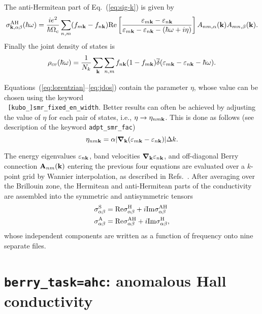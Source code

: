 The anti-Hermitean part of Eq.~(\ref{eq:sig-k}) is given by
%
\begin{equation}
\label{eq:sig-AH}
\sigma_{{\bf k},\alpha\beta}^{\rm AH}(\hbar\omega)=\frac{ie^2}{\hbar\Omega_c}
\sum_{n,m}(f_{m{\bf k}}-f_{n{\bf k}})
{\rm Re}\left[ \frac{\varepsilon_{m{\bf k}}-\varepsilon_{n{\bf k}}}
                    {\varepsilon_{m{\bf k}}-\varepsilon_{n{\bf k}}
                     -(\hbar\omega+i\eta)}
\right]
A_{nm,\alpha}({\bf k})A_{mn,\beta}({\bf k}).
\end{equation}
%
Finally the joint density of states is
%
\begin{equation}
\label{eq:jdos}
\rho_{cv}(\hbar\omega)=\frac{1}{N_k}\sum_{\bf k}\sum_{n,m}
f_{n{\bf k}}(1-f_{m{\bf k}})
\overline{\delta}(\varepsilon_{m{\bf k}}-\varepsilon_{n{\bf k}}-\hbar\omega).
\end{equation}

Equations~(\ref{eq:lorentzian}--\ref{eq:jdos}) contain the parameter
$\eta$, whose value can be chosen using the keyword\\ {\tt
  [kubo\_]smr\_fixed\_en\_width}. Better results can often be achieved
by adjusting the value of $\eta$ for each pair of states, i.e.,
$\eta\rightarrow \eta_{nm\bf k}$. This is done as follows (see
description of the keyword {\tt adpt\_smr\_fac})
%
\begin{equation}
\eta_{nm{\bf k}}=\alpha\vert \bm{\nabla}_{\bf k}
(\varepsilon_{m{\bf k}}-\varepsilon_{n{\bf k}})\vert \Delta k.
\end{equation}

The energy eigenvalues $\varepsilon_{n\bf k}$, band velocities
$\bm{\nabla}_{\bf k}\varepsilon_{n{\bf k}}$, and off-diagonal Berry
connection ${\bf A}_{nm}({\bf k})$ entering the previous four
equations are evaluated over a $k$-point grid by Wannier
interpolation, as described in Refs.~\cite{wang-prb06,yates-prb07}.
After averaging over the Brillouin zone, the Hermitean and
anti-Hermitean parts of the conductivity are assembled into the
symmetric and antisymmetric tensors
%
\begin{align}
\sigma^{\rm S}_{\alpha\beta}&=
{\rm Re}\sigma^{\rm H}_{\alpha\beta}+i{\rm Im}\sigma^{\rm AH}_{\alpha\beta}\\
\sigma^{\rm A}_{\alpha\beta}&=
{\rm Re}\sigma^{\rm AH}_{\alpha\beta}+i{\rm Im}\sigma^{\rm H}_{\alpha\beta},
\end{align}
%
whose independent components are written as a function of frequency
onto nine separate files.

\section{{\tt berry\_task=ahc}: anomalous Hall conductivity}

